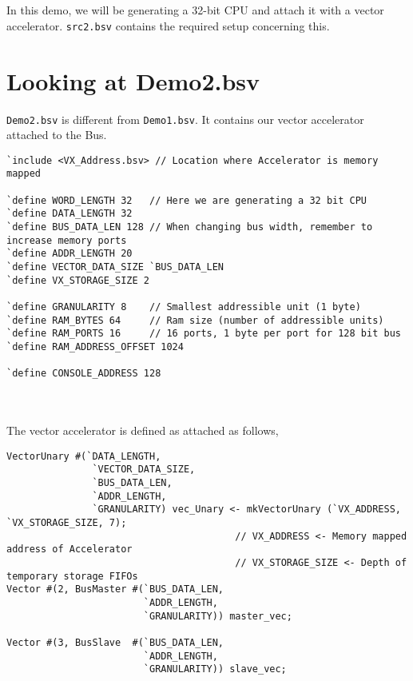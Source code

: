 \begin{paper}
\renewcommand*{\pagemark}{}

\section*{}
In this demo, we will be generating a 32-bit CPU and attach it with a vector accelerator. \texttt{src\Demo\Demo2.bsv} contains the required setup concerning this. 
\section*{Looking at Demo2.bsv\sdot}
\texttt{Demo2.bsv} is different from \texttt{Demo1.bsv}. It contains our vector accelerator attached to the Bus.
\begin{verbatim}
`include <VX_Address.bsv> // Location where Accelerator is memory mapped

`define WORD_LENGTH 32   // Here we are generating a 32 bit CPU
`define DATA_LENGTH 32
`define BUS_DATA_LEN 128 // When changing bus width, remember to increase memory ports 
`define ADDR_LENGTH 20
`define VECTOR_DATA_SIZE `BUS_DATA_LEN
`define VX_STORAGE_SIZE 2

`define GRANULARITY 8    // Smallest addressible unit (1 byte)
`define RAM_BYTES 64     // Ram size (number of addressible units)
`define RAM_PORTS 16     // 16 ports, 1 byte per port for 128 bit bus
`define RAM_ADDRESS_OFFSET 1024

`define CONSOLE_ADDRESS 128
\end{verbatim}\\\\
\nointed The vector accelerator is defined as attached as follows,
\begin{verbatim}
VectorUnary #(`DATA_LENGTH,
               `VECTOR_DATA_SIZE,
               `BUS_DATA_LEN,
               `ADDR_LENGTH,
               `GRANULARITY) vec_Unary <- mkVectorUnary (`VX_ADDRESS, `VX_STORAGE_SIZE, 7);
                                        // VX_ADDRESS <- Memory mapped address of Accelerator
                                        // VX_STORAGE_SIZE <- Depth of temporary storage FIFOs
Vector #(2, BusMaster #(`BUS_DATA_LEN, 
                        `ADDR_LENGTH, 
                        `GRANULARITY)) master_vec;

Vector #(3, BusSlave  #(`BUS_DATA_LEN, 
                        `ADDR_LENGTH, 
                        `GRANULARITY)) slave_vec;


\end{verbatim}
\end{paper}
